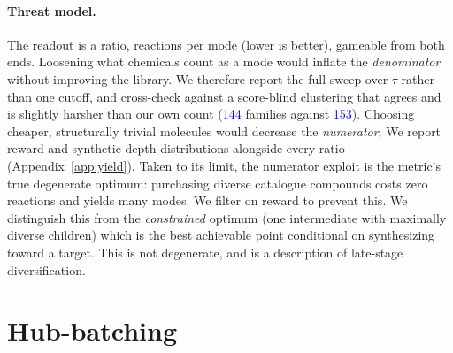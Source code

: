 \documentclass{article}
\newcommand{\checkval}[1]{\textcolor{blue}{#1}}
\begin{document}
\paragraph{Threat model.}
The readout is a ratio, reactions per mode (lower is better), gameable from both ends. Loosening what chemicals count as a mode would inflate the \emph{denominator} without improving the library. We therefore report the full sweep over $\tau$ rather than one cutoff, and cross-check against a score-blind clustering that agrees and is slightly harsher than our own count (\checkval{144} families against \checkval{153}). Choosing cheaper, structurally trivial molecules would decrease the \emph{numerator}; We report reward and synthetic-depth distributions alongside every ratio (Appendix~\ref{app:yield}). Taken to its limit, the numerator exploit is the metric's true degenerate optimum: purchasing diverse catalogue compounds costs zero reactions and yields many modes. We filter on reward to prevent this. We distinguish this from the \emph{constrained} optimum (one intermediate with maximally diverse children) which is the best achievable point conditional on synthesizing toward a target. This is not degenerate, and is a description of late-stage diversification.


\section{Hub-batching}
\label{sec:method}
\end{document}
